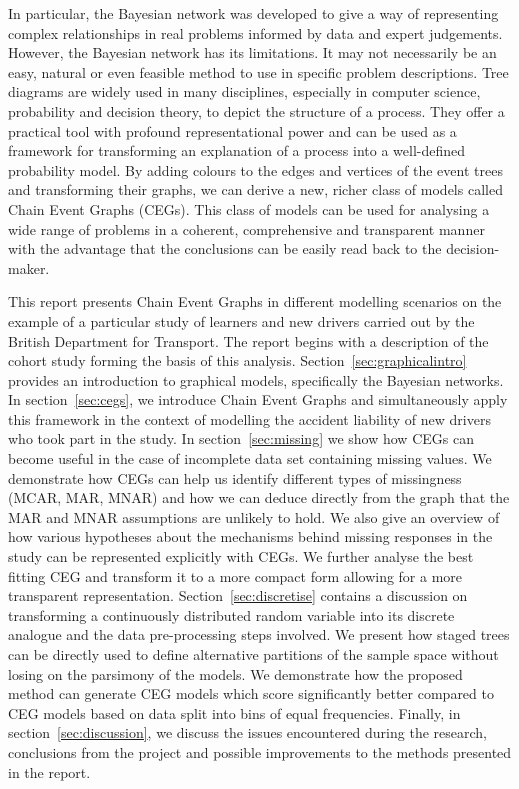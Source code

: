 \documentclass[runningheads]{llncs}
\begin{document}
In particular, the Bayesian network was developed to give a way of representing complex relationships in real problems informed by data and expert judgements. However, the Bayesian network has its limitations. It may not necessarily be an easy, natural or even feasible method to use in specific problem descriptions. Tree diagrams are widely used in many disciplines, especially in computer science, probability and decision theory, to depict the structure of a process. They offer a practical tool with profound representational power and can be used as a framework for transforming an explanation of a process into a well-defined probability model. By adding colours to the edges and vertices of the event trees and transforming their graphs, we can derive a new, richer class of models called Chain Event Graphs (CEGs). This class of models can be used for analysing a wide range of problems in a coherent, comprehensive and transparent manner with the advantage that the conclusions can be easily read back to the decision-maker.

This report presents Chain Event Graphs in different modelling scenarios on the example of a particular study of learners and new drivers carried out by the British Department for Transport. The report begins with a description of the cohort study forming the basis of this analysis. Section~\ref{sec:graphicalintro} provides an introduction to graphical models, specifically the Bayesian networks. In section~\ref{sec:cegs}, we introduce Chain Event Graphs and simultaneously apply this framework in the context of modelling the accident liability of new drivers who took part in the study. In section~\ref{sec:missing} we show how CEGs can become useful in the case of incomplete data set containing missing values. We demonstrate how CEGs can help us identify different types of missingness (MCAR, MAR, MNAR) and how we can deduce directly from the graph that the MAR and MNAR assumptions are unlikely to hold. We also give an overview of how various hypotheses about the mechanisms behind missing responses in the study can be represented explicitly with CEGs. We further analyse the best fitting CEG and transform it to a more compact form allowing for a more transparent representation. Section~\ref{sec:discretise} contains a discussion on transforming a continuously distributed random variable into its discrete analogue and the data pre-processing steps involved. We present how staged trees can be directly used to define alternative partitions of the sample space without losing on the parsimony of the models.  We demonstrate how the proposed method can generate CEG models which score significantly better compared to CEG models based on data split into bins of equal frequencies. Finally, in section~\ref{sec:discussion}, we discuss the issues encountered during the research, conclusions from the project and possible improvements to the methods presented in the report. 
\end{document}
